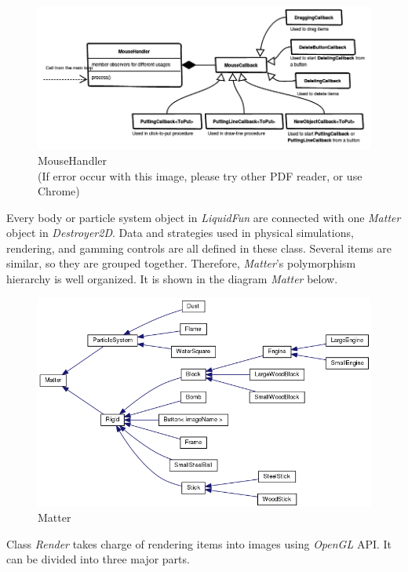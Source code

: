 \documentclass[UTF8]{ctexart}
\begin{document}
            \begin{figure}[htp]
                \centering
                \includegraphics[width=\textwidth]{mousehandler.png}
                \caption{MouseHandler\\(If error occur with this image, please try other PDF reader, or use Chrome)}
            \end{figure}

            Every body or particle system object in \textit{LiquidFun} are connected with one \textit{Matter} object in \textit{Destroyer2D}. Data and strategies used in physical simulations, rendering, and gamming controls are all defined in these class. Several items are similar, so they are grouped together. Therefore, \textit{Matter}'s polymorphism hierarchy is well organized. It is shown in the diagram \textit{Matter} below.

            \begin{figure}[htp]
                \centering
                \includegraphics[width=\textwidth]{matter.png}
                \caption{Matter}
            \end{figure}

            Class \textit{Render} takes charge of rendering items into images using \textit{OpenGL} API. It can be divided into three major parts.
\end{document}
